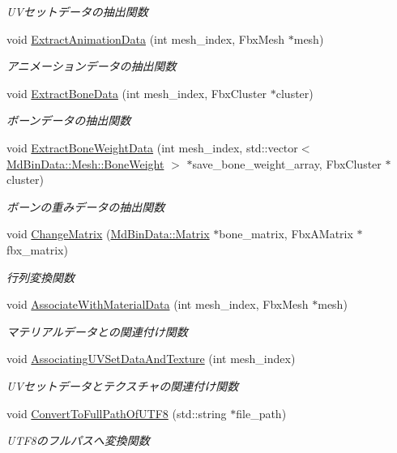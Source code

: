 \begin{DoxyCompactItemize}
\begin{DoxyCompactList}\small\item\em U\+Vセットデータの抽出関数 \end{DoxyCompactList}\item 
void \mbox{\hyperlink{class_fbx_converter_a3f07e7dae9ba8bcb83dca611aeb5b3a0}{Extract\+Animation\+Data}} (int mesh\+\_\+index, Fbx\+Mesh $\ast$mesh)
\begin{DoxyCompactList}\small\item\em アニメーションデータの抽出関数 \end{DoxyCompactList}\item 
void \mbox{\hyperlink{class_fbx_converter_a0df95f11a3cd66ba0ecf06244efe52e7}{Extract\+Bone\+Data}} (int mesh\+\_\+index, Fbx\+Cluster $\ast$cluster)
\begin{DoxyCompactList}\small\item\em ボーンデータの抽出関数 \end{DoxyCompactList}\item 
void \mbox{\hyperlink{class_fbx_converter_a744068ceddd573d1add39a484e25bdc6}{Extract\+Bone\+Weight\+Data}} (int mesh\+\_\+index, std\+::vector$<$ \mbox{\hyperlink{class_md_bin_data_1_1_mesh_1_1_bone_weight}{Md\+Bin\+Data\+::\+Mesh\+::\+Bone\+Weight}} $>$ $\ast$save\+\_\+bone\+\_\+weight\+\_\+array, Fbx\+Cluster $\ast$cluster)
\begin{DoxyCompactList}\small\item\em ボーンの重みデータの抽出関数 \end{DoxyCompactList}\item 
void \mbox{\hyperlink{class_fbx_converter_a4587ba56496d6aa8cdfdd9ea92300c46}{Change\+Matrix}} (\mbox{\hyperlink{class_md_bin_data_1_1_matrix}{Md\+Bin\+Data\+::\+Matrix}} $\ast$bone\+\_\+matrix, Fbx\+A\+Matrix $\ast$fbx\+\_\+matrix)
\begin{DoxyCompactList}\small\item\em 行列変換関数 \end{DoxyCompactList}\item 
void \mbox{\hyperlink{class_fbx_converter_aa5a81e3afe4ea2bdc101863f6c1f0326}{Associate\+With\+Material\+Data}} (int mesh\+\_\+index, Fbx\+Mesh $\ast$mesh)
\begin{DoxyCompactList}\small\item\em マテリアルデータとの関連付け関数 \end{DoxyCompactList}\item 
void \mbox{\hyperlink{class_fbx_converter_a0d669f32bb338dffeb5d1989a0b374d7}{Associating\+U\+V\+Set\+Data\+And\+Texture}} (int mesh\+\_\+index)
\begin{DoxyCompactList}\small\item\em U\+Vセットデータとテクスチャの関連付け関数 \end{DoxyCompactList}\item 
void \mbox{\hyperlink{class_fbx_converter_a471d98b3d59a3f32dd2403577deebad7}{Convert\+To\+Full\+Path\+Of\+U\+T\+F8}} (std\+::string $\ast$file\+\_\+path)
\begin{DoxyCompactList}\small\item\em U\+T\+F8のフルパスへ変換関数 \end{DoxyCompactList}\end{DoxyCompactItemize}
